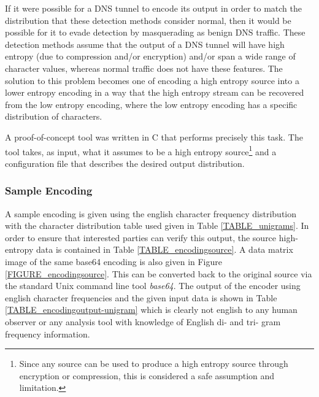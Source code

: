\documentclass[12pt]{report}
\theoremstyle{remark}
\theoremstyle{definition}
\theoremstyle{definition}
\theoremstyle{definition}
\begin{document}
If it were possible for a DNS tunnel to encode its output in order to match the distribution that these detection methods consider normal, then it would be possible for it to evade detection by masquerading as benign DNS traffic. These detection methods assume that the output of a DNS tunnel will have high entropy (due to compression and/or encryption) and/or span a wide range of character values, whereas normal traffic does not have these features. The solution to this problem becomes one of encoding a high entropy source into a lower entropy encoding in a way that the high entropy stream can be recovered from the low entropy encoding, where the low entropy encoding has a specific distribution of characters.

A proof-of-concept tool was written in C that performs precisely this task. The tool takes, as input, what it assumes to be a high entropy source\footnote{Since any source can be used to produce a high entropy source through encryption or compression, this is considered a safe assumption and limitation.} and a configuration file that describes the desired output distribution.

\subsubsection{Sample Encoding}
A sample encoding is given using the english character frequency distribution with the character distribution table used given in Table \ref{TABLE_unigrams}. In order to ensure that interested parties can verify this output, the source high-entropy data is contained in Table \ref{TABLE_encodingsource}. A data matrix image of the same base64 encoding is also given in Figure \ref{FIGURE_encodingsource}. This can be converted back to the original source via the standard Unix command line tool \emph{base64}. The output of the encoder using english character frequencies and the given input data is shown in Table \ref{TABLE_encodingoutput-unigram} which is clearly not english to any human observer or any analysis tool with knowledge of English di- and tri- gram frequency information.
\end{document}

